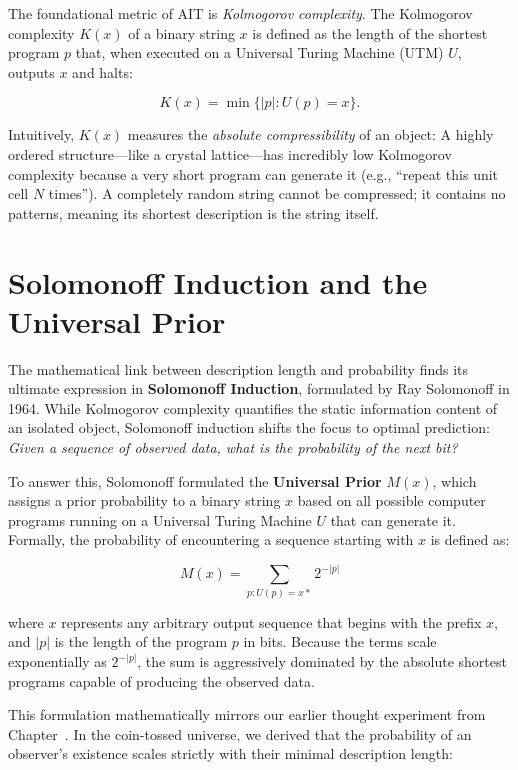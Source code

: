 The foundational metric of AIT is \emph{Kolmogorov complexity}.
The Kolmogorov complexity $K(x)$ of a binary string $x$ is defined as the length of the shortest program $p$ that, when executed on a Universal Turing Machine (UTM) $U$, outputs $x$ and halts:

\[
K(x) = \min \{ |p| : U(p) = x \}.
\]

Intuitively, $K(x)$ measures the \emph{absolute compressibility} of an object:
A highly ordered structure—like a crystal lattice—has incredibly low Kolmogorov complexity because a very short program can generate it (e.g., ``repeat this unit cell $N$ times'').
A completely random string cannot be compressed; it contains no patterns, meaning its shortest description is the string itself. 



\section{Solomonoff Induction and the Universal Prior}

The mathematical link between description length and probability finds its ultimate expression in \textbf{Solomonoff Induction}, formulated by Ray Solomonoff in 1964.
While Kolmogorov complexity quantifies the static information content of an isolated object,
Solomonoff induction shifts the focus to optimal prediction: \emph{Given a sequence of observed data, what is the probability of the next bit?}

To answer this, Solomonoff formulated the \textbf{Universal Prior} $M(x)$, which assigns a prior probability to a binary string $x$ based on all possible computer programs running on a Universal Turing Machine $U$ that can generate it. Formally, the probability of encountering a sequence starting with $x$ is defined as:

\[
M(x) = \sum_{p: U(p) = x*} 2^{-|p|}
\]

where $x$ represents any arbitrary output sequence that begins with the prefix $x$, and $|p|$ is the length of the program $p$ in bits. Because the terms scale exponentially as $2^{-|p|}$, the sum is aggressively dominated by the absolute shortest programs capable of producing the observed data. 

This formulation mathematically mirrors our earlier thought experiment from Chapter~.
In the coin-tossed universe, we derived that the probability of an observer's existence scales strictly with their minimal description length:

